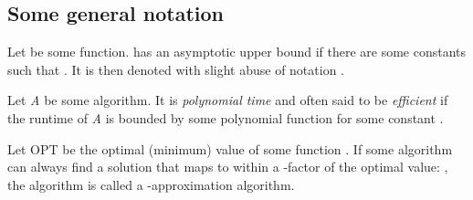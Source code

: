 \subsection{Some general notation}

\begin{definition}
	Let  be some function.   has an asymptotic upper bound  if there are some constants  such that . It is then denoted with slight abuse of notation .  
\end{definition}

Let \emph{A} be some algorithm. 
It is \emph{polynomial time} and often said to be \emph{efficient} if the runtime of \emph{A} is bounded by some polynomial function  for some constant .

Let OPT be the optimal (minimum) value of some function . If some algorithm  can always find a solution that maps to within a \ilmath{\rho}-factor of the optimal value: , the algorithm is called a \ilmath{\rho}-approximation algorithm. 
